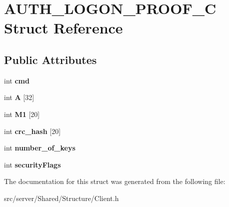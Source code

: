\hypertarget{struct_a_u_t_h___l_o_g_o_n___p_r_o_o_f___c}{\section{A\-U\-T\-H\-\_\-\-L\-O\-G\-O\-N\-\_\-\-P\-R\-O\-O\-F\-\_\-\-C Struct Reference}
\label{struct_a_u_t_h___l_o_g_o_n___p_r_o_o_f___c}
}
\subsection*{Public Attributes}
\begin{DoxyCompactItemize}
\item 
\hypertarget{struct_a_u_t_h___l_o_g_o_n___p_r_o_o_f___c_ab5ebb6c258f8c8145dde05d6f51676ca}{int {\bfseries cmd}}\label{struct_a_u_t_h___l_o_g_o_n___p_r_o_o_f___c_ab5ebb6c258f8c8145dde05d6f51676ca}

\item 
\hypertarget{struct_a_u_t_h___l_o_g_o_n___p_r_o_o_f___c_a0b6e6d937878d6899fb0a9edcfb2a855}{int {\bfseries A} \mbox{[}32\mbox{]}}\label{struct_a_u_t_h___l_o_g_o_n___p_r_o_o_f___c_a0b6e6d937878d6899fb0a9edcfb2a855}

\item 
\hypertarget{struct_a_u_t_h___l_o_g_o_n___p_r_o_o_f___c_a22532519abfd579165db2411eec927cc}{int {\bfseries M1} \mbox{[}20\mbox{]}}\label{struct_a_u_t_h___l_o_g_o_n___p_r_o_o_f___c_a22532519abfd579165db2411eec927cc}

\item 
\hypertarget{struct_a_u_t_h___l_o_g_o_n___p_r_o_o_f___c_ac2503bd2e46a810e9a1b8b49bcb63116}{int {\bfseries crc\-\_\-hash} \mbox{[}20\mbox{]}}\label{struct_a_u_t_h___l_o_g_o_n___p_r_o_o_f___c_ac2503bd2e46a810e9a1b8b49bcb63116}

\item 
\hypertarget{struct_a_u_t_h___l_o_g_o_n___p_r_o_o_f___c_a383f7c9cee71121e3591c988e41f6ccf}{int {\bfseries number\-\_\-of\-\_\-keys}}\label{struct_a_u_t_h___l_o_g_o_n___p_r_o_o_f___c_a383f7c9cee71121e3591c988e41f6ccf}

\item 
\hypertarget{struct_a_u_t_h___l_o_g_o_n___p_r_o_o_f___c_af99249ee0b3a4987fff8f910c5f70ef7}{int {\bfseries security\-Flags}}\label{struct_a_u_t_h___l_o_g_o_n___p_r_o_o_f___c_af99249ee0b3a4987fff8f910c5f70ef7}

\end{DoxyCompactItemize}


The documentation for this struct was generated from the following file\-:\begin{DoxyCompactItemize}
\item 
src/server/\-Shared/\-Structure/Client.\-h\end{DoxyCompactItemize}
